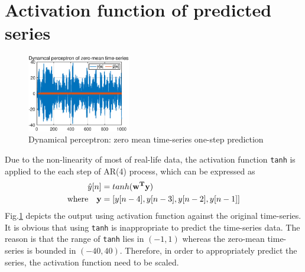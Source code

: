 \section{Activation function of predicted series}
\begin{figure}[htb]
     \centering
     \includegraphics[width=0.4\textwidth]{fig/4/42.eps}
     \caption{Dynamical perceptron: zero mean time-series one-step prediction}
     \label{fig:4_2}
\end{figure}
\noindent
Due to the non-linearity of most of real-life data, the activation function \texttt{tanh} is applied to the each step of AR(4) process, which can be expressed as 
\begin{align}
\hat y[n]&=tanh(\mathbf{w^Ty})\label{eq:act}\\
\text{where}\quad \mathbf{y}&=[y[n-4], y[n-3], y[n-2], y[n-1]]\notag
\end{align}
Fig.\ref{fig:4_2} depicts the output using activation function against the original time-series. It is obvious that using \texttt{tanh} is inappropriate to predict the time-series data. The reason is that the range of \texttt{tanh} lies in $(-1,1)$ whereas the zero-mean time-series is bounded in $(-40,40)$. Therefore, in order to appropriately predict the series, the activation function need to be scaled.
